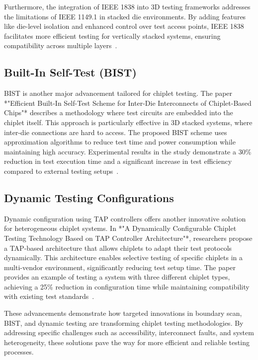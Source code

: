 \documentclass[acmtog, 12pt]{acmart}
\begin{document}
Furthermore, the integration of IEEE 1838 into 3D testing frameworks addresses the limitations of IEEE 1149.1 in stacked die environments. By adding features like die-level isolation and enhanced control over test access points, IEEE 1838 facilitates more efficient testing for vertically stacked systems, ensuring compatibility across multiple layers~\cite{6515989}.

\subsection*{Built-In Self-Test (BIST)}
BIST is another major advancement tailored for chiplet testing. The paper *"Efficient Built-In Self-Test Scheme for Inter-Die Interconnects of Chiplet-Based Chips"* describes a methodology where test circuits are embedded into the chiplet itself. This approach is particularly effective in 3D stacked systems, where inter-die connections are hard to access. The proposed BIST scheme uses approximation algorithms to reduce test time and power consumption while maintaining high accuracy. Experimental results in the study demonstrate a 30\% reduction in test execution time and a significant increase in test efficiency compared to external testing setups~\cite{10766679}.

\subsection*{Dynamic Testing Configurations}
Dynamic configuration using TAP controllers offers another innovative solution for heterogeneous chiplet systems. In *"A Dynamically Configurable Chiplet Testing Technology Based on TAP Controller Architecture"*, researchers propose a TAP-based architecture that allows chiplets to adapt their test protocols dynamically. This architecture enables selective testing of specific chiplets in a multi-vendor environment, significantly reducing test setup time. The paper provides an example of testing a system with three different chiplet types, achieving a 25\% reduction in configuration time while maintaining compatibility with existing test standards~\cite{9824550}.

These advancements demonstrate how targeted innovations in boundary scan, BIST, and dynamic testing are transforming chiplet testing methodologies. By addressing specific challenges such as accessibility, interconnect faults, and system heterogeneity, these solutions pave the way for more efficient and reliable testing processes.
\end{document}
